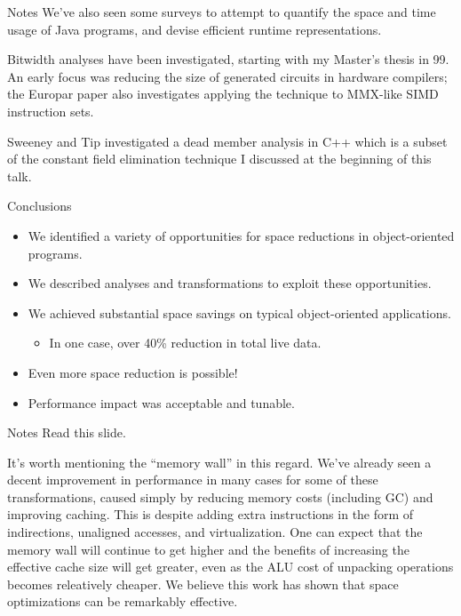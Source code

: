 \documentclass[%
pdf,
colorBG,
slideColor,
nototal,
oqe
]{prosper}
\newenvironment{talknotes}{\begin{slide}{Notes}\tiny}{\end{slide}}
\begin{document}
\begin{talknotes}
We've also seen some surveys to attempt to quantify the space and time
usage of Java programs, and devise efficient runtime representations.

Bitwidth analyses have been investigated, starting with my Master's
thesis in 99.  An early focus was reducing the size of generated
circuits in hardware compilers; the Europar paper also investigates
applying the technique to MMX-like SIMD instruction sets.

Sweeney and Tip investigated a dead member analysis in C++ which
is a subset of the constant field elimination technique I discussed at
the beginning of this talk.
\end{talknotes}

\begin{slide}{Conclusions}
\begin{itemize}
 \item We identified a variety of opportunities for space reductions in
 object-oriented programs.
 \item We described analyses and transformations to exploit these
 opportunities. 
 \item We achieved substantial space savings on typical
   object-oriented applications.
 \begin{itemize}
  \item In one case, over 40\% reduction in total live data.
 \end{itemize}
 \item Even more space reduction is possible!
 \item Performance impact was acceptable and tunable.
\end{itemize}
\end{slide}

\begin{talknotes}
Read this slide.

It's worth mentioning the ``memory wall'' in this regard.  We've
already seen a decent improvement in performance in many cases for
some of these transformations, caused simply by reducing memory costs
(including GC) and improving caching.  This is despite adding extra
instructions in the form of indirections, unaligned accesses, and
virtualization.  One can
expect that the memory wall will continue to get higher and the
benefits of increasing the effective cache size will get greater, even
as the ALU cost of unpacking operations becomes releatively cheaper.
We believe this work has shown that space optimizations can be
remarkably effective.
\end{talknotes}
\end{document}
